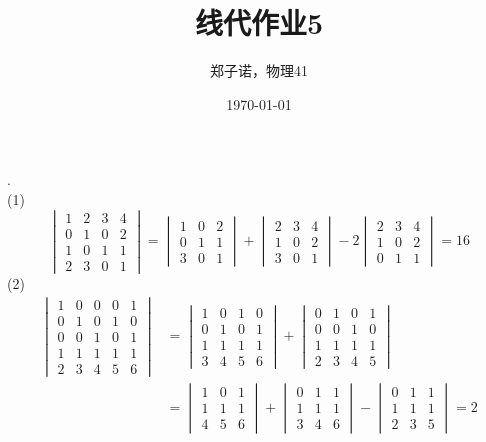 \documentclass[utf8]{ctexart}
\title{线代作业5}
\author{郑子诺，物理41}
\date{\today}
\begin{document}
\maketitle
{}.\\
(1)
\[\begin{vmatrix}
	1&2&3&4\\
	0&1&0&2\\
	1&0&1&1\\
	2&3&0&1
\end{vmatrix}
=\begin{vmatrix}
	1&0&2\\
	0&1&1\\
	3&0&1
\end{vmatrix}+
\begin{vmatrix}
	2&3&4\\
	1&0&2\\
	3&0&1
\end{vmatrix}
-2\begin{vmatrix}
	2&3&4\\
	1&0&2\\
	0&1&1
\end{vmatrix}
=16\]
(2)
\begin{align*}
	\begin{vmatrix}
		1&0&0&0&1\\
		0&1&0&1&0\\
		0&0&1&0&1\\
		1&1&1&1&1\\
		2&3&4&5&6
	\end{vmatrix}
	&=\begin{vmatrix}
		1&0&1&0\\
		0&1&0&1\\
		1&1&1&1\\
		3&4&5&6
	\end{vmatrix}
	+\begin{vmatrix}
		0&1&0&1\\
		0&0&1&0\\
		1&1&1&1\\
		2&3&4&5
	\end{vmatrix}\\
	&=\begin{vmatrix}
		1&0&1\\
		1&1&1\\
		4&5&6
	\end{vmatrix}+\begin{vmatrix}
	0&1&1\\
	1&1&1\\
	3&4&6
	\end{vmatrix}-\begin{vmatrix}
	0&1&1\\
	1&1&1\\
	2&3&5
	\end{vmatrix}=2
\end{align*}
\end{document}
